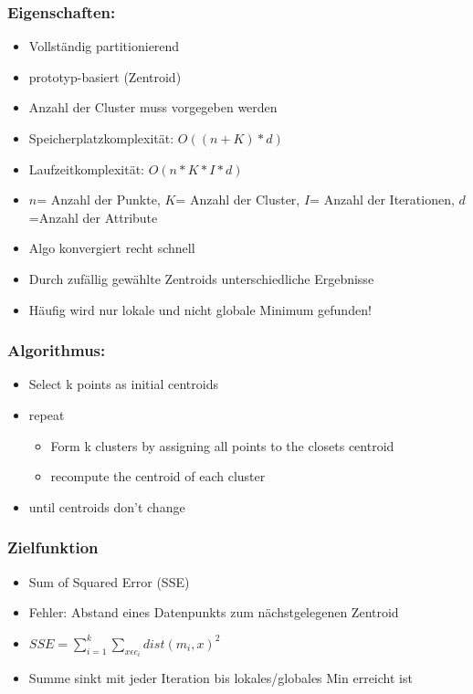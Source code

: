 \documentclass[a4paper]{article}
\begin{document}
\begin{landscape}
\begin{multicols}{3}
    \subsubsection{Eigenschaften:}
    \begin{itemize}[noitemsep,nolistsep]
        \item Vollständig partitionierend
        \item prototyp-basiert (Zentroid)
        \item Anzahl der Cluster muss vorgegeben werden
        \item Speicherplatzkomplexität: $O((n+K)*d)$
        \item Laufzeitkomplexität: $O(n*K*I*d)$
        \item $n$= Anzahl der Punkte, $K$= Anzahl der Cluster, $I$= Anzahl der Iterationen, $d$=Anzahl der Attribute
        \item Algo konvergiert recht schnell
        \item Durch zufällig gewählte Zentroids unterschiedliche Ergebnisse
        \item Häufig wird nur lokale und nicht globale Minimum gefunden!
    \end{itemize}

    \subsubsection{Algorithmus:}
    \begin{itemize}[noitemsep,nolistsep]
        \item Select k points as initial centroids
        \item repeat
        \begin{itemize}[noitemsep,nolistsep]
            \item Form k clusters by assigning all points to the closets centroid
            \item recompute the centroid of each cluster
        \end{itemize}
        \item until centroids don't change
    \end{itemize}

    \subsubsection{Zielfunktion}
    \begin{itemize}[noitemsep,nolistsep]
        \item Sum of Squared Error (SSE)
        \item Fehler: Abstand eines Datenpunkts zum nächstgelegenen Zentroid
        \item $SSE = \sum_{i=1}^{k}\sum_{x \epsilon c_i} dist(m_i, x)^2$
        \item Summe sinkt mit jeder Iteration bis lokales/globales Min erreicht ist
    \end{itemize}


\end{multicols}
\end{landscape}
\end{document}
